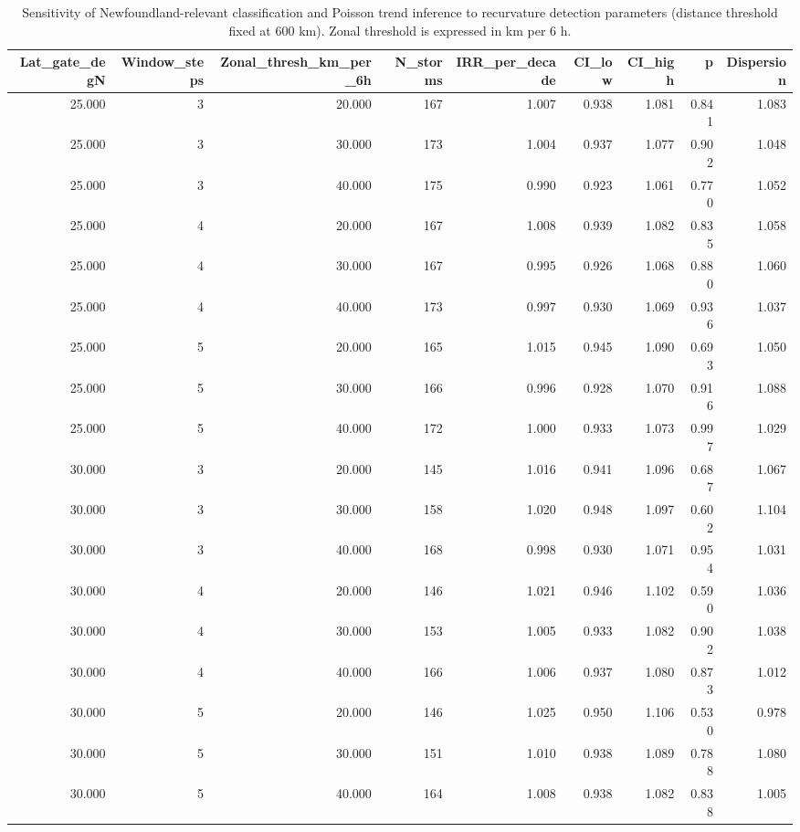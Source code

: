 \begin{table}[H]
\centering
\caption{Sensitivity of Newfoundland-relevant classification and Poisson trend inference to recurvature detection parameters (distance threshold fixed at 600 km). Zonal threshold is expressed in km per 6 h.}
\label{tab:recurv_sens}
\begin{tabular}{r r r r r r r r r}
\hline
Lat_gate_degN & Window_steps & Zonal_thresh_km_per_6h & N_storms & IRR_per_decade & CI_low & CI_high & p & Dispersion \\
\hline
25.000 & 3 & 20.000 & 167 & 1.007 & 0.938 & 1.081 & 0.841 & 1.083 \\
25.000 & 3 & 30.000 & 173 & 1.004 & 0.937 & 1.077 & 0.902 & 1.048 \\
25.000 & 3 & 40.000 & 175 & 0.990 & 0.923 & 1.061 & 0.770 & 1.052 \\
25.000 & 4 & 20.000 & 167 & 1.008 & 0.939 & 1.082 & 0.835 & 1.058 \\
25.000 & 4 & 30.000 & 167 & 0.995 & 0.926 & 1.068 & 0.880 & 1.060 \\
25.000 & 4 & 40.000 & 173 & 0.997 & 0.930 & 1.069 & 0.936 & 1.037 \\
25.000 & 5 & 20.000 & 165 & 1.015 & 0.945 & 1.090 & 0.693 & 1.050 \\
25.000 & 5 & 30.000 & 166 & 0.996 & 0.928 & 1.070 & 0.916 & 1.088 \\
25.000 & 5 & 40.000 & 172 & 1.000 & 0.933 & 1.073 & 0.997 & 1.029 \\
30.000 & 3 & 20.000 & 145 & 1.016 & 0.941 & 1.096 & 0.687 & 1.067 \\
30.000 & 3 & 30.000 & 158 & 1.020 & 0.948 & 1.097 & 0.602 & 1.104 \\
30.000 & 3 & 40.000 & 168 & 0.998 & 0.930 & 1.071 & 0.954 & 1.031 \\
30.000 & 4 & 20.000 & 146 & 1.021 & 0.946 & 1.102 & 0.590 & 1.036 \\
30.000 & 4 & 30.000 & 153 & 1.005 & 0.933 & 1.082 & 0.902 & 1.038 \\
30.000 & 4 & 40.000 & 166 & 1.006 & 0.937 & 1.080 & 0.873 & 1.012 \\
30.000 & 5 & 20.000 & 146 & 1.025 & 0.950 & 1.106 & 0.530 & 0.978 \\
30.000 & 5 & 30.000 & 151 & 1.010 & 0.938 & 1.089 & 0.788 & 1.080 \\
30.000 & 5 & 40.000 & 164 & 1.008 & 0.938 & 1.082 & 0.838 & 1.005 \\
\hline
\end{tabular}

\end{table}